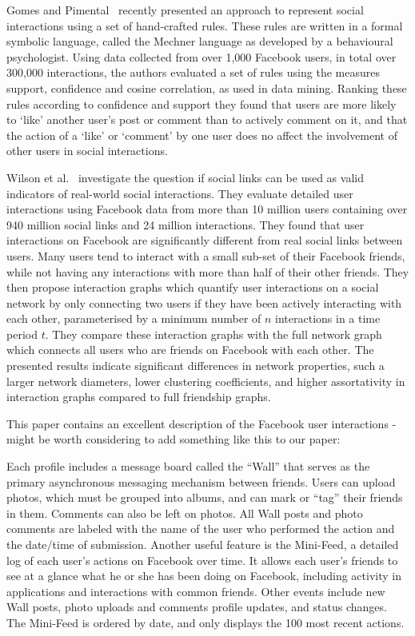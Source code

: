 \documentclass[letterpaper]{article}
\begin{document}
Gomes and Pimental~\cite{gomes2011social} recently presented an
approach to represent social interactions using a set of hand-crafted
rules. These rules are written in a formal symbolic language, called
the Mechner language as developed by a behavioural psychologist. Using
data collected from over 1,000 Facebook users, in total over 300,000
interactions, the authors evaluated a set of rules using the measures
support, confidence and cosine correlation, as used in data mining.
Ranking these rules according to confidence and support they found
that users are more likely to `like' another user's post or comment
than to actively comment on it, and that the action of a `like' or
`comment' by one user does no affect the involvement of other users in
social interactions.




Wilson et al.~\cite{wilson2009user} investigate the question if social
links can be used as valid indicators of real-world social
interactions. They evaluate detailed user interactions using Facebook
data from more than 10 million users containing over 940 million
social links and 24 million interactions. They found that user
interactions on Facebook are significantly different from real social
links between users. Many users tend to interact with a small sub-set
of their Facebook friends, while not having any interactions with more
than half of their other friends. They then propose interaction graphs
which quantify user interactions on a social network by only
connecting two users if they have been actively interacting with each
other, parameterised by a minimum number of $n$ interactions in a time
period $t$. They compare these interaction graphs with the full
network graph which connects all users who are friends on Facebook
with each other. The presented results indicate significant
differences in network properties, such a larger network diameters,
lower clustering coefficients, and higher assortativity in interaction
graphs compared to full friendship graphs.






 This paper contains an excellent description of the Facebook
 user interactions - might be worth considering to add something
 like this to our paper:


 
Each profile includes a message board called the “Wall”
that serves as the primary asynchronous messaging mechanism
between friends. Users can upload photos, which must
be grouped into albums, and can mark or “tag” their friends
in them. Comments can also be left on photos. All Wall posts
and photo comments are labeled with the name of the user
who performed the action and the date/time of submission.
Another useful feature is the Mini-Feed, a detailed log of
each user’s actions on Facebook over time. It allows each
user’s friends to see at a glance what he or she has been
doing on Facebook, including activity in applications and
interactions with common friends. Other events include new
Wall posts, photo uploads and comments profile updates, and
status changes. The Mini-Feed is ordered by date, and only
displays the 100 most recent actions.
\end{document}
